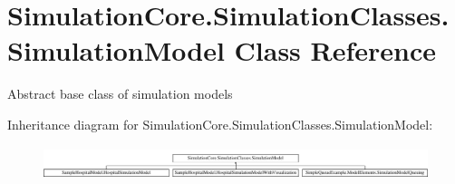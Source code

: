 \hypertarget{class_simulation_core_1_1_simulation_classes_1_1_simulation_model}{}\section{Simulation\+Core.\+Simulation\+Classes.\+Simulation\+Model Class Reference}
\label{class_simulation_core_1_1_simulation_classes_1_1_simulation_model}


Abstract base class of simulation models  


Inheritance diagram for Simulation\+Core.\+Simulation\+Classes.\+Simulation\+Model\+:\begin{figure}[H]
\begin{center}
\leavevmode
\includegraphics[height=0.990274cm]{class_simulation_core_1_1_simulation_classes_1_1_simulation_model}
\end{center}
\end{figure}
